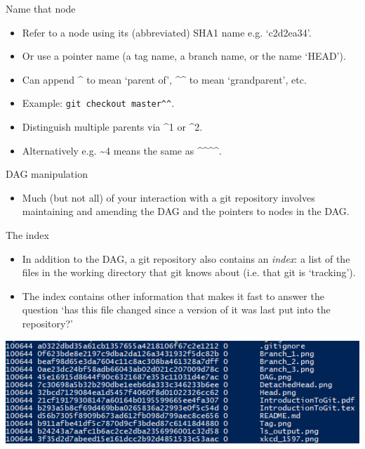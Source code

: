 \documentclass[usenames,dvipsnames]{beamer}
\newcommand{\code}[1]{\colorbox{light-gray}{\texttt{#1}}}
\begin{document}
\begin{frame}{Name that node}
  \begin{block}{}
    \begin{itemize}
      \item{Refer to a node using its (abbreviated) SHA1 name e.g. `c2d2ea34'.}
      \item{Or use a pointer name (a tag name, a branch name, or the name `HEAD').}
      \item{Can append \^{} to mean `parent of', \^{}\^{} to mean `grandparent', etc.}
      \item{Example: \code{git checkout master\^{}\^{}}.}
      \item{Distinguish multiple parents via \^{}1 or \^{}2.}
      \item{Alternatively e.g. \textasciitilde4 means the same as \^{}\^{}\^{}\^{}.}
    \end{itemize}
  \end{block}
\end{frame}

\begin{frame}{DAG manipulation}
  \begin{block}{}
    \begin{itemize}
      \item{Much (but not all) of your interaction with a git repository involves maintaining and amending the DAG and the pointers to nodes in the DAG.}
    \end{itemize}
  \end{block}
\end{frame}


\begin{frame}{The index}
  \begin{block}{}
    \begin{itemize}
      \item{In addition to the DAG, a git repository also contains an \textit{index}: a list of the files in the working directory that git knows about (i.e. that git is `tracking').}
      \item{The index contains other information that makes it fast to answer the question `has this file changed since a version of it was last put into the repository?'}
    \end{itemize}
  \end{block}
  \begin{block}{}
    \begin{center}
      \includegraphics[scale=0.7]{Index.png}
    \end{center}
  \end{block}
\end{frame}
\end{document}

